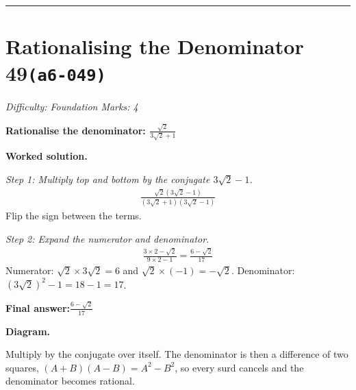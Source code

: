 \documentclass[11pt]{article}
\newcommand{\question}[1]{\par\medskip\noindent\textbf{#1}\par}
\begin{document}
\medskip\hrule

\section*{Rationalising the Denominator 49\quad\small\texttt{(a6-049)}}
\textit{Difficulty: Foundation \quad\textbar\quad Marks: 4}

\question{Rationalise the denominator: \( \frac{\sqrt{2}}{3\sqrt{2} + 1} \)}

\textbf{Worked solution.}

\textit{Step 1: Multiply top and bottom by the conjugate \( 3\sqrt{2} - 1 \).}
\[\begin{gathered}
\frac{\sqrt{2}(3\sqrt{2} - 1)}{(3\sqrt{2} + 1)(3\sqrt{2} - 1)}
\end{gathered}\]
Flip the sign between the terms.

\textit{Step 2: Expand the numerator and denominator.}
\[\begin{gathered}
\frac{3 \times 2 - \sqrt{2}}{9 \times 2 - 1} = \frac{6 - \sqrt{2}}{17}
\end{gathered}\]
Numerator: \( \sqrt{2} \times 3\sqrt{2} = 6 \) and \( \sqrt{2} \times (-1) = -\sqrt{2} \). Denominator: \( (3\sqrt{2})^2 - 1 = 18 - 1 = 17 \).

\begin{answerbox}
\textbf{Final answer:}\quad \(\displaystyle \frac{6 - \sqrt{2}}{17}\)
\end{answerbox}
\textbf{Diagram.}

\begin{center}
\end{center}
\small Multiply by the conjugate over itself. The denominator is then a difference of two squares, $(A+B)(A-B)=A^{2}-B^{2}$, so every surd cancels and the denominator becomes rational.\normalsize
\end{document}
